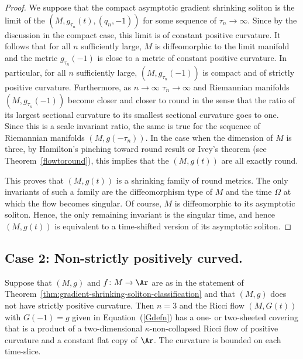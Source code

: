 \begin{proof}
We suppose that the compact asymptotic gradient shrinking soliton is
the limit of the $(M,g_{\tau_n}(t),(q_n,-1))$ for some sequence of
$\tau_n\rightarrow\infty$. Since by the discussion in the compact
case, this limit is of constant positive curvature. It follows that
for all $n$ sufficiently large, $M$ is diffeomorphic to the limit
manifold and the metric $g_{\tau_n}(-1)$ is close to a metric of
constant positive curvature.  In particular, for all $n$
sufficiently large, $(M,g_{\tau_n}(-1))$ is compact and of strictly
positive curvature. Furthermore, as $n\rightarrow\infty$
$\tau_n\rightarrow\infty$ and Riemannian manifolds
$(M,g_{\tau_n}(-1))$ become closer and closer to round in the sense
that the ratio of its largest sectional curvature to its smallest
sectional curvature goes to one. Since this is a scale invariant
ratio, the same is true for the sequence of Riemannian manifolds
$(M,g(-\tau_n))$. In the case when the dimension of $M$ is three, by
Hamilton's pinching toward round result or Ivey's theorem (see
Theorem~\ref{flowtoround}), this implies that the $(M,g(t))$ are all
exactly round.



This proves that $(M,g(t))$ is a shrinking family of round metrics.
The only invariants of such a family are the diffeomorphism type of
$M$ and the time $\Omega$ at which the flow becomes singular. Of
course, $M$ is diffeomorphic to its asymptotic soliton. Hence, the
only remaining invariant is the singular time, and hence $(M,g(t))$
is equivalent to a time-shifted version of its asymptotic soliton.
\end{proof}

\subsection{Case 2: Non-strictly positively curved.}


\begin{claim}\label{claim:non-strictly-positive-curvature-splitting}
\label{flatssplit}
Suppose that $(M,g)$ and $f\colon M\to \Ar$ are as in the statement
of Theorem~\ref{thm:gradient-shrinking-soliton-classification} and that $(M,g)$ does not have strictly
positive curvature. Then $n=3$ and the Ricci flow $(M,G(t))$ with
$G(-1)=g$ given in Equation~(\ref{Gdefn}) has a one- or two-sheeted
covering that is a product of a two-dimensional
$\kappa$-non-collapsed Ricci flow of positive curvature and a
constant flat copy of $\Ar$. The curvature is bounded on each
time-slice.
\end{claim}


